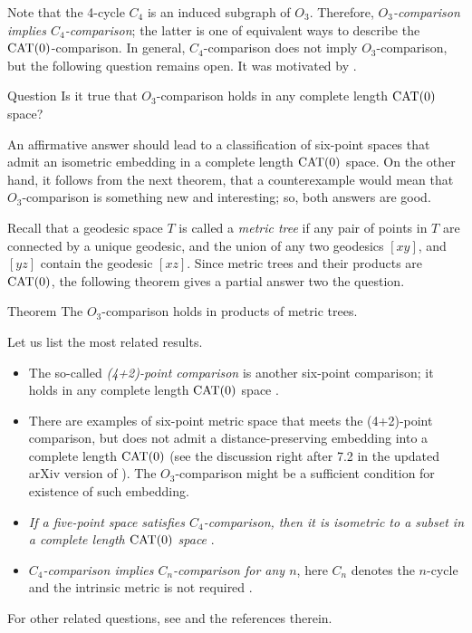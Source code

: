 \documentclass{article}
\begin{document}
Note that the 4-cycle $C_4$ is an induced subgraph of $O_3$.
Therefore, \textit{$O_3$-comparison implies $C_4$-comparison};
the latter is one of equivalent ways to describe the $\mathrm{CAT}(0)$-comparison.
In general, $C_4$-comparison does not imply $O_3$-comparison,
but the following question remains open.
It was motivated by \cite[1.19$_+(e)$]{gromov}.

\begin{thm}{Question}
Is it true that $O_3$-comparison holds in any complete length $\mathrm{CAT}(0)$ space?
\end{thm}

An affirmative answer should lead to a classification of six-point spaces that admit an isometric embedding in a complete length $\mathrm{CAT}(0)$ space.
On the other hand, it follows from the next theorem,
that a counterexample would mean that $O_3$-comparison is something new and interesting;
so, both answers are good.

Recall that a geodesic space $T$ is called a \emph{metric tree} if any pair of points in $T$ are connected by a unique geodesic,
and the union of any two geodesics $[xy]$, and $[yz]$ contain the geodesic $[xz]$.
Since metric trees and their products are $\mathrm{CAT}(0)$, the following theorem gives a partial answer two the question.

\begin{thm}{Theorem}
The $O_3$-comparison holds in products of metric trees.
\end{thm}

Let us list the most related results.
\begin{itemize}
\item The so-called \emph{(4+2)-point comparison} is another six-point comparison;
it holds in any complete length $\mathrm{CAT}(0)$ space \cite{AKP-Kirszbraun,alexander2019alexandrov}.

\item There are examples of six-point metric space that meets the (4+2)-point comparison, but does not admit a distance-preserving embedding into a complete length $\mathrm{CAT}(0)$
(see the discussion right after 7.2 in the updated arXiv version of \cite{AKP-Kirszbraun}).
The $O_3$-comparison might be a sufficient condition for existence of such embedding.

\item \textit{If a five-point space satisfies $C_4$-comparison, then it is isometric to a subset in a complete length $\mathrm{CAT}(0)$ space} \cite{toyoda,lebedeva-petrunin}.

\item \textit{$C_4$-comparison implies $C_n$-comparison for any $n$},
here $C_n$ denotes the $n$-cycle and the intrinsic metric is not required \cite{toyoda2019}. 
\end{itemize}
For other related questions, see \cite{petrunin-2017,lebedeva-petrunin,lebedeva-petrunin-zolotov,lebedeva,lebedeva-petrunin-CBB,lebedeva-petrunin-graph-alexandrov, noar} and the references therein.
\end{document}
